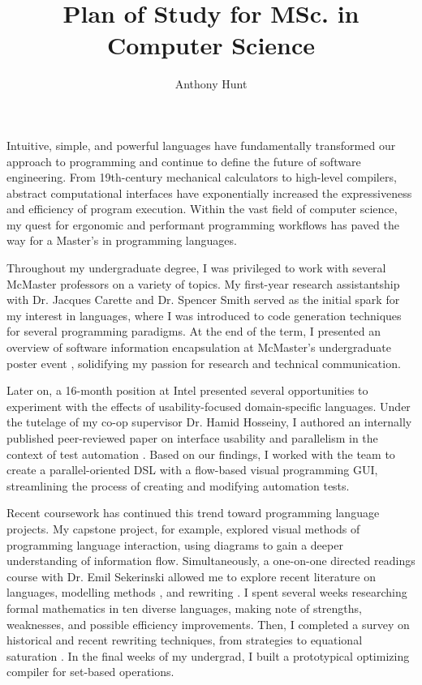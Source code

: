 \documentclass{article}
\title{Plan of Study for MSc. in Computer Science}
\author{Anthony Hunt}
\begin{document}

Intuitive, simple, and powerful languages have fundamentally transformed our approach to programming and continue to define the future of software engineering. From 19th-century mechanical calculators to high-level compilers, abstract computational interfaces have exponentially increased the expressiveness and efficiency of program execution. Within the vast field of computer science, my quest for ergonomic and performant programming workflows has paved the way for a Master's in programming languages.

Throughout my undergraduate degree, I was privileged to work with several McMaster professors on a variety of topics. My first-year research assistantship with Dr. Jacques Carette and Dr. Spencer Smith served as the initial spark for my interest in languages, where I was introduced to code generation techniques for several programming paradigms. At the end of the term, I presented an overview of software information encapsulation at McMaster's undergraduate poster event \cite{hunt2021information}, solidifying my passion for research and technical communication.

Later on, a 16-month position at Intel presented several opportunities to experiment with the effects of usability-focused domain-specific languages. Under the tutelage of my co-op supervisor Dr. Hamid Hosseiny, I authored an internally published peer-reviewed paper on interface usability and parallelism in the context of test automation \cite{hunt2024memautogui}. Based on our findings, I worked with the team to create a parallel-oriented DSL with a flow-based visual programming GUI, streamlining the process of creating and modifying automation tests.

Recent coursework has continued this trend toward programming language projects. My capstone project, for example, explored visual methods of programming language interaction, using diagrams to gain a deeper understanding of information flow. Simultaneously, a one-on-one directed readings course with Dr. Emil Sekerinski allowed me to explore recent literature on languages, modelling methods \cite{eventBBook}, and rewriting \cite{baader1998term}. I spent several weeks researching formal mathematics in ten diverse languages, making note of strengths, weaknesses, and possible efficiency improvements. Then, I completed a survey on historical and recent rewriting techniques, from strategies \cite{elco1998building} to equational saturation \cite{tate2009equality}. In the final weeks of my undergrad, I built a prototypical optimizing compiler for set-based operations.
\end{document}
